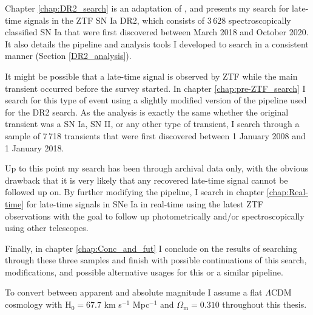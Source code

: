 \documentclass[a4paper,oneside,12pt, class=Latex/Classes/PhDthesisPSnPDF, crop=false]{standalone}
\begin{document}
Chapter \ref{chap:DR2_search} is an adaptation of \cite{Terwel_2024_paper1}, and presents my search for late-time signals in the ZTF SN Ia DR2, which consists of $3\,628$ spectroscopically classified SN Ia that were first discovered between March 2018 and October 2020. It also details the pipeline and analysis tools I developed to search in a consistent manner (Section \ref{DR2_analysis}).

It might be possible that a late-time signal is observed by ZTF while the main transient occurred before the survey started. In chapter \ref{chap:pre-ZTF_search} I search for this type of event using a slightly modified version of the pipeline used for the DR2 search. As the analysis is exactly the same whether the original transient was a SN Ia, SN II, or any other type of transient, I search through a sample of 7\,718 transients that were first discovered between 1 January 2008 and 1 January 2018.

Up to this point my search has been through archival data only, with the obvious drawback that it is very likely that any recovered late-time signal cannot be followed up on. By further modifying the pipeline, I search in chapter \ref{chap:Real-time} for late-time signals in SNe Ia in real-time using the latest ZTF observations with the goal to follow up photometrically and/or spectroscopically using other telescopes.

Finally, in chapter \ref{chap:Conc_and_fut} I conclude on the results of searching through these three samples and finish with possible continuations of this search, modifications, and possible alternative usages for this or a similar pipeline.

To convert between apparent and absolute magnitude I assume a flat $\Lambda$CDM cosmology with H$_0 = 67.7$ km s$^{-1}$ Mpc$^{-1}$ and $\Omega_\text{m} = 0.310$ \citep{Planck18VI} throughout this thesis.
\end{document}
